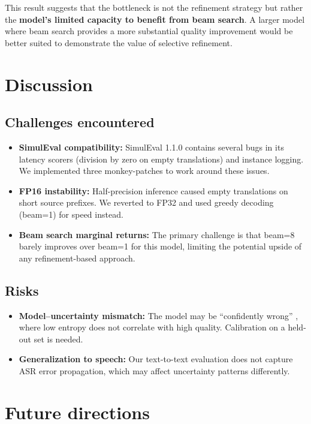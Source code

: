 This result suggests that the bottleneck is not the refinement strategy but rather the \textbf{model's limited capacity to benefit from beam search}. A larger model where beam search provides a more substantial quality improvement would be better suited to demonstrate the value of selective refinement.

\section{Discussion}

\subsection{Challenges encountered}

\begin{itemize}[leftmargin=*]
    \item \textbf{SimulEval compatibility:} SimulEval 1.1.0 contains several bugs in its latency scorers (division by zero on empty translations) and instance logging. We implemented three monkey-patches to work around these issues.
    \item \textbf{FP16 instability:} Half-precision inference caused empty translations on short source prefixes. We reverted to FP32 and used greedy decoding (beam=1) for speed instead.
    \item \textbf{Beam search marginal returns:} The primary challenge is that beam=8 barely improves over beam=1 for this model, limiting the potential upside of any refinement-based approach.
\end{itemize}

\subsection{Risks}

\begin{itemize}[leftmargin=*]
    \item \textbf{Model--uncertainty mismatch:} The model may be ``confidently wrong'' \citep{wang2020calibration}, where low entropy does not correlate with high quality. Calibration on a held-out set is needed.
    \item \textbf{Generalization to speech:} Our text-to-text evaluation does not capture ASR error propagation, which may affect uncertainty patterns differently.
\end{itemize}

\section{Future directions}

